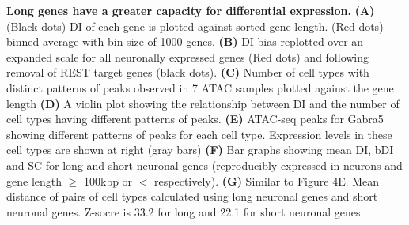 \textbf{Long genes have a greater capacity for differential expression.}
\textbf{(A)} (Black dots) DI of each gene is plotted against sorted gene length. (Red dots) binned average with bin size of 1000 genes.
\textbf{(B)} DI bias replotted over an expanded scale for all neuronally expressed genes (Red dots) and following removal of REST target genes (black dots).
\textbf{(C)} Number of cell types with distinct patterns of peaks observed in 7 ATAC samples plotted against the gene length
\textbf{(D)} A violin plot showing the relationship between DI and the number of cell types having different patterns of peaks. 
\textbf{(E)} ATAC-seq peaks for Gabra5 showing different patterns of peaks for each cell type. Expression levels in these cell types are shown at right (gray bars)
\textbf{(F)} Bar graphs showing mean DI, bDI and SC for long and short neuronal genes (reproducibly expressed in neurons and gene length $\geq$ 100kbp or $<$ respectively). 
\textbf{(G)} Similar to Figure 4E. Mean distance of pairs of cell types calculated using long neuronal genes and short neuronal genes. Z-socre is 33.2 for long and 22.1 for short neuronal genes. 
